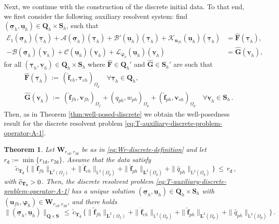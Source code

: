 \documentclass[11pt]{article}
\numberwithin{equation}{section}
\newcommand{\bsi}{{\boldsymbol\sigma}}
\newcommand{\bvarphi}{{\boldsymbol\varphi}}
\newcommand{\btau}{{\boldsymbol\tau}}
\newcommand{\ubsi}{\underline{\bsi}}
\newcommand{\ubtau}{\underline{\btau}}
\newcommand{\ubu}{\underline{\bu}}
\newcommand{\ubv}{\underline{\bv}}
\newcommand{\bv}{{\mathbf{v}}}
\newcommand{\f}{\mathbf{f}}
\newcommand{\bu}{\mathbf{u}}
\newcommand{\0}{{\mathbf{0}}}
\def\bF{\mathbf{F}}
\def\bG{\mathbf{G}}
\def\bW{\mathbf{W}}
\def\bT{\mathbf{T}}
\def\bQ{\mathbf{Q}}
\def\bS{\mathbf{S}}
\newcommand{\bL}{\mathbf{L}}
\newcommand\bbL{\mathbb{L}}
\newcommand{\cA}{\mathcal{A}}
\newcommand{\cB}{\mathcal{B}}
\newcommand{\cC}{\mathcal{C}}
\newcommand{\cE}{\mathcal{E}}
\newcommand{\cK}{\mathcal{K}}
\newcommand{\cL}{\mathcal{L}}
\def\L{\mathrm{L}}
\def\ttd{\mathtt{d}}
\def\wt{\widetilde}
\def\wh{\widehat}
\newtheorem{thm}{Theorem}[section]
\numberwithin{equation}{section}
\begin{document}
Next, we continue with the construction of the discrete initial data.
To that end, we first consider the following auxiliary resolvent system: find $(\ubsi_{h},\ubu_{h})\in \bQ_{h}\times \bS_{h}$, such that
\begin{align}
\cE_1(\ubsi_{h})(\ubtau_{h}) + \cA(\ubsi_{h})(\ubtau_{h}) + \cB'(\ubu_{h})(\ubtau_{h}) + \cK_{\bu_{fh}}(\ubu_{h})(\ubtau_{h}) 
&= \wh{\bF}(\ubtau_{h}), \nonumber\\ 
- \cB(\ubsi_{h})(\ubv_{h}) + \cC(\ubu_{h})(\ubv_{h})+\cL_{\bvarphi_{h}}(\ubu_{h})(\ubv_{h}) 
&= \wh{\bG}(\ubv_{h}),\label{eq:T-auxiliary-discrete-problem-operator-A-1}
\end{align}
for all $(\ubtau_{h},\ubv_{h})\in \bQ_{h}\times \bS_{h}$ where $\wh{\bF} \in \bQ_{h}'$ and $\wh{\bG} \in \bS_{h}'$ are such that
%
\begin{align*}
& \wh{\bF}(\ubtau_{h}) \,:=\, (\wh{\f}_{eh},\btau_{eh})_{\Omega_p} \quad \forall \ubtau_{h} \in \bQ_{h}, \nonumber\\ 
& \wh{\bG}(\ubv_{h}) \,:=\, (\wh{\f}_{fh},\bv_{fh})_{\Omega_f} + (\wh{q}_{ph},w_{ph})_{\Omega_p} + (\wh{\f}_{ph},\bv_{sh})_{\Omega_p} \quad \forall \ubv_{h} \in \bS_{h} \,.
\end{align*}
Then, as in Theorem \ref{thm:well-posed-discrete} we obtain the well-posedness result for the discrete resolvent problem \eqref{eq:T-auxiliary-discrete-problem-operator-A-1}.
%
\begin{thm}\label{thm:well-posed-discrete-1}
Let $\bW_{r_{1\ttd},r_{2\ttd}}$ be as in \eqref{eq:Wr-discrete-definition} and let $r_\ttd:=\min\big\{r_{1\ttd}, r_{2\ttd}\big\}$. 
Assume that the data satisfy
%
\begin{equation}\label{eq:discrete-T-maps-Wr-into-Wr-1}
\wt{c}_{\bT_{\ttd}}\,\Big\{ \|\wh{\f}_{fh}\|_{\bL^2(\Omega_f)} 
+ \|\wh{\f}_{eh}\|_{\bbL^2(\Omega_p)}
+ \|\wh{\f}_{ph}\|_{\bL^2(\Omega_p)} 
+ \|\wh{q}_{ph}\|_{\L^2(\Omega_p)} \Big\} \,\leq\, r_\ttd\,,
\end{equation}	
with $\wt{c}_{\bT_{\tt d}}>0$.
Then, the discrete resolvent problem \eqref{eq:T-auxiliary-discrete-problem-operator-A-1} has a unique solution $(\ubsi_{h},\ubu_{h})\in \bQ_{h}\times \bS_{h}$ with $(\bu_{fh},\bvarphi_{h})\in \bW_{r_{1\ttd},r_{2\ttd}}$, and there holds
%
\begin{equation*}%
\|(\ubsi_{h},\ubu_{h})\|_{\bQ\times \bS} 
\,\leq\, \widetilde{c}_{\bT_{\ttd}}\,\Big\{ \|\wh{\f}_{fh}\|_{\bL^2(\Omega_f)} +  \|\wh{\f}_{eh}\|_{\bbL^2(\Omega_p)}+ \|\wh{\f}_{ph}\|_{\bL^2(\Omega_p)} + \|\wh{q}_{ph}\|_{\L^2(\Omega_p)}\Big\} \,.
\end{equation*} 
\end{thm}
\end{document}
